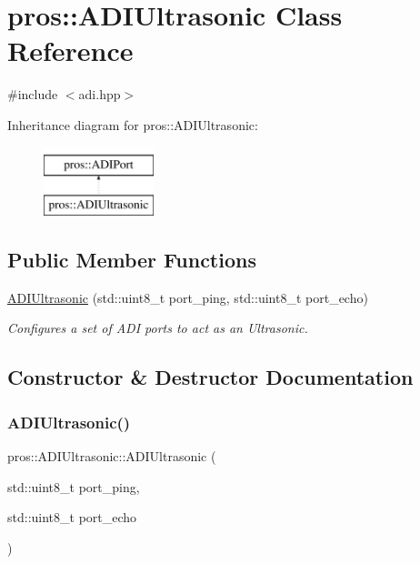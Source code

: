 \hypertarget{classpros_1_1ADIUltrasonic}{}\section{pros\+:\+:A\+D\+I\+Ultrasonic Class Reference}
\label{classpros_1_1ADIUltrasonic}


{\ttfamily \#include $<$adi.\+hpp$>$}

Inheritance diagram for pros\+:\+:A\+D\+I\+Ultrasonic\+:\begin{figure}[H]
\begin{center}
\leavevmode
\includegraphics[height=2.000000cm]{classpros_1_1ADIUltrasonic}
\end{center}
\end{figure}
\subsection*{Public Member Functions}
\begin{DoxyCompactItemize}
\item 
\hyperlink{classpros_1_1ADIUltrasonic_ae2b4cd186556af9602cc0017d324494b}{A\+D\+I\+Ultrasonic} (std\+::uint8\+\_\+t port\+\_\+ping, std\+::uint8\+\_\+t port\+\_\+echo)
\begin{DoxyCompactList}\small\item\em Configures a set of A\+DI ports to act as an Ultrasonic. \end{DoxyCompactList}\end{DoxyCompactItemize}


\subsection{Constructor \& Destructor Documentation}
\mbox{\label{classpros_1_1ADIUltrasonic_ae2b4cd186556af9602cc0017d324494b}} 
\subsubsection{\texorpdfstring{A\+D\+I\+Ultrasonic()}{ADIUltrasonic()}}
{\footnotesize\ttfamily pros\+::\+A\+D\+I\+Ultrasonic\+::\+A\+D\+I\+Ultrasonic (\begin{DoxyParamCaption}\item[{std\+::uint8\+\_\+t}]{port\+\_\+ping,  }\item[{std\+::uint8\+\_\+t}]{port\+\_\+echo }\end{DoxyParamCaption})}



